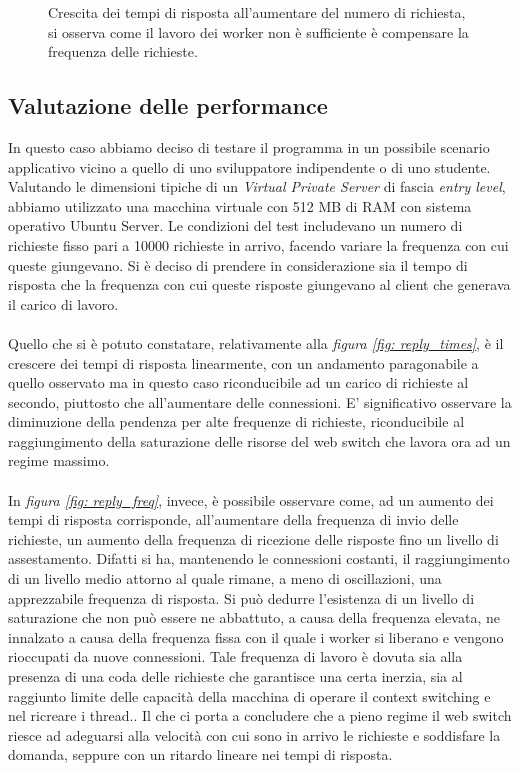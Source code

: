 \documentclass[italian]{tktltiki2}
\begin{document}
\begin{figure}[H]
\caption{Crescita dei tempi di risposta all'aumentare del numero di richiesta, si osserva come il lavoro dei worker non è sufficiente è compensare la frequenza delle richieste. \label{fig: cfr_reply_time2}}
\end{figure}
\subsection{Valutazione delle performance}
In questo caso abbiamo deciso di testare il programma in un possibile scenario applicativo vicino a quello di uno sviluppatore indipendente o di uno studente. Valutando le dimensioni tipiche di un \emph{Virtual Private Server} di fascia \emph{entry level}, abbiamo utilizzato una macchina virtuale con 512 MB di RAM con sistema operativo Ubuntu Server. Le condizioni del test includevano un numero di richieste fisso pari a 10000 richieste in arrivo, facendo variare la frequenza con cui queste giungevano. Si è deciso di prendere in considerazione sia il tempo di risposta che la frequenza con cui queste risposte giungevano al client che generava il carico di lavoro. \\\\ 
Quello che si è potuto constatare, relativamente alla \emph{figura \ref{fig: reply_times}}, è il crescere dei tempi di risposta linearmente, con un andamento paragonabile a quello osservato ma in questo caso riconducibile ad un carico di richieste al secondo, piuttosto che all'aumentare delle connessioni. E' significativo osservare la diminuzione della pendenza per alte frequenze di richieste, riconducibile al raggiungimento della saturazione delle risorse del web switch che lavora ora ad un regime massimo.\\\\
In \emph{figura \ref{fig: reply_freq}}, invece, è possibile osservare come, ad un aumento dei tempi di risposta corrisponde, all'aumentare della frequenza di invio delle richieste, un aumento della frequenza di ricezione delle risposte fino un livello di assestamento. Difatti si ha, mantenendo le connessioni costanti, il raggiungimento di un livello medio attorno al quale rimane, a meno di oscillazioni, una apprezzabile frequenza di risposta. Si può dedurre l'esistenza di un livello di saturazione che non può essere ne abbattuto, a causa della frequenza elevata, ne innalzato a causa della frequenza fissa con il quale i worker si liberano e vengono rioccupati da nuove connessioni. Tale frequenza di lavoro è dovuta sia alla presenza di una coda delle richieste che garantisce una certa inerzia, sia al raggiunto limite delle capacità della macchina di operare il context switching e nel ricreare i thread.. Il che ci porta a concludere che a pieno regime il web switch riesce ad adeguarsi alla velocità con cui sono in arrivo le richieste e soddisfare la domanda, seppure con un ritardo lineare nei tempi di risposta.
\end{document}
